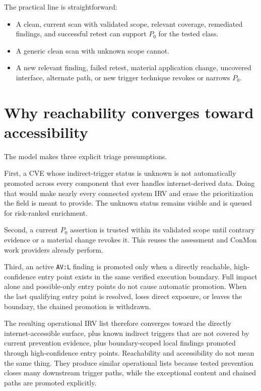 \documentclass[11pt]{article}
\newcommand{\code}[1]{\texttt{#1}}
\begin{document}
The practical line is straightforward:

\begin{itemize}[leftmargin=1.5em]
\item A clean, current scan with validated scope, relevant coverage, remediated
  findings, and successful retest can support $P_0$ for the tested class.
\item A generic clean scan with unknown scope cannot.
\item A new relevant finding, failed retest, material application change,
  uncovered interface, alternate path, or new trigger technique revokes or
  narrows $P_0$.
\end{itemize}

\section*{Why reachability converges toward accessibility}
The model makes three explicit triage presumptions.

First, a CVE whose indirect-trigger status is unknown is not automatically
promoted across every component that ever handles internet-derived data. Doing
that would make nearly every connected system IRV and erase the prioritization
the field is meant to provide. The unknown status remains visible and is queued
for risk-ranked enrichment.

Second, a current $P_0$ assertion is trusted within its validated scope until
contrary evidence or a material change revokes it. This reuses the assessment and
ConMon work providers already perform.

Third, an active \code{AV:L} finding is promoted only when a directly reachable,
high-confidence entry point exists in the same verified execution boundary.
Full impact alone and possible-only entry points do not cause automatic
promotion. When the last qualifying entry point is resolved, loses direct
exposure, or leaves the boundary, the chained promotion is withdrawn.

The resulting operational IRV list therefore converges toward the directly
internet-accessible surface, plus known indirect triggers that are not covered
by current prevention evidence, plus boundary-scoped local findings promoted
through high-confidence entry points. Reachability and accessibility do not mean
the same thing. They produce similar operational lists because tested prevention
closes many downstream trigger paths, while the exceptional content and chained
paths are promoted explicitly.
\end{document}
